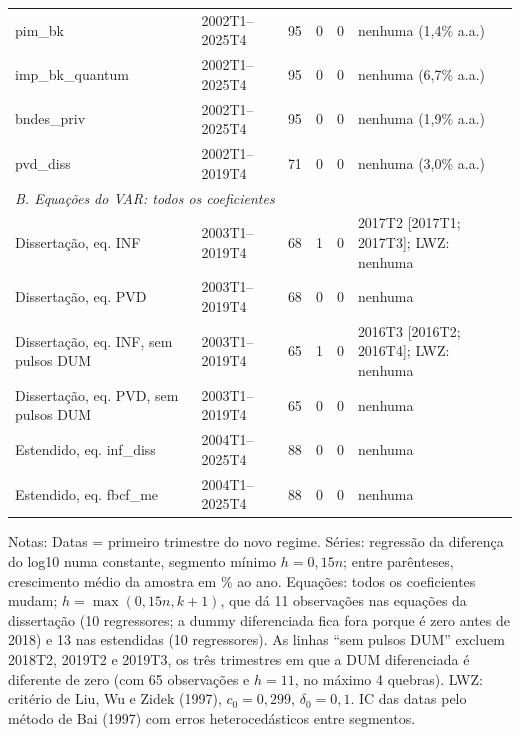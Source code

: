 \begin{table}[htbp]
\begin{tabular}{llcccl}
pim\_bk & 2002T1--2025T4 & 95 & 0 & 0 & nenhuma (1{,}4\% a.a.) \\
imp\_bk\_quantum & 2002T1--2025T4 & 95 & 0 & 0 & nenhuma (6{,}7\% a.a.) \\
bndes\_priv & 2002T1--2025T4 & 95 & 0 & 0 & nenhuma (1{,}9\% a.a.) \\
pvd\_diss & 2002T1--2019T4 & 71 & 0 & 0 & nenhuma (3{,}0\% a.a.) \\
\midrule
\multicolumn{6}{l}{\textit{B. Equa\c{c}\~oes do VAR: todos os coeficientes}} \\
Disserta\c{c}\~ao, eq. INF & 2003T1--2019T4 & 68 & 1 & 0 & 2017T2 [2017T1; 2017T3]; LWZ: nenhuma \\
Disserta\c{c}\~ao, eq. PVD & 2003T1--2019T4 & 68 & 0 & 0 & nenhuma \\
Disserta\c{c}\~ao, eq. INF, sem pulsos DUM & 2003T1--2019T4 & 65 & 1 & 0 & 2016T3 [2016T2; 2016T4]; LWZ: nenhuma \\
Disserta\c{c}\~ao, eq. PVD, sem pulsos DUM & 2003T1--2019T4 & 65 & 0 & 0 & nenhuma \\
Estendido, eq. inf\_diss & 2004T1--2025T4 & 88 & 0 & 0 & nenhuma \\
Estendido, eq. fbcf\_me & 2004T1--2025T4 & 88 & 0 & 0 & nenhuma \\
\bottomrule
\end{tabular}
\begin{minipage}{0.97\linewidth}\footnotesize
\medskip Notas: Datas = primeiro trimestre do novo regime. S\'eries: regress\~ao da diferen\c{c}a do log10 numa constante, segmento m\'inimo $h = 0{,}15n$; entre par\^enteses, crescimento m\'edio da amostra em \% ao ano. Equa\c{c}\~oes: todos os coeficientes mudam; $h = \max(0{,}15n, k + 1)$, que d\'a 11 observa\c{c}\~oes nas equa\c{c}\~oes da disserta\c{c}\~ao (10 regressores; a dummy diferenciada fica fora porque \'e zero antes de 2018) e 13 nas estendidas (10 regressores). As linhas ``sem pulsos DUM'' excluem 2018T2, 2019T2 e 2019T3, os tr\^es trimestres em que a DUM diferenciada \'e diferente de zero (com 65 observa\c{c}\~oes e $h = 11$, no m\'aximo 4 quebras). LWZ: crit\'erio de Liu, Wu e Zidek (1997), $c_0 = 0{,}299$, $\delta_0 = 0{,}1$. IC das datas pelo m\'etodo de Bai (1997) com erros heteroced\'asticos entre segmentos.
\end{minipage}
\end{table}

